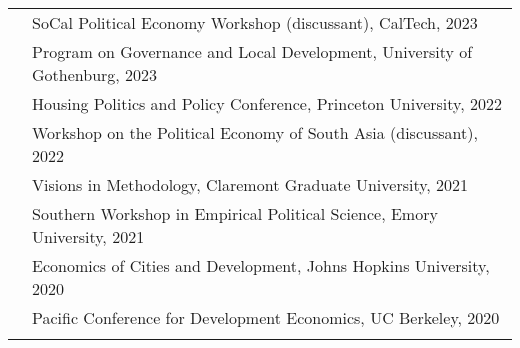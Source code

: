 \documentclass[letterpaper, 10.5pt]{article}
\begin{document}
\begin{longtable}{p{1.5in}p{5in}}
&SoCal Political Economy Workshop (discussant), CalTech, 2023\\
 &Program on Governance and Local Development, University of Gothenburg, 2023\\

           &Housing Politics and Policy Conference, Princeton University, 2022\\
 & Workshop on the Political Economy of South Asia (discussant), 2022\\        



  & Visions in Methodology, Claremont Graduate University, 2021 \\
  
    &Southern Workshop in Empirical Political Science, Emory University, 2021 \\
 

 & Economics of Cities and Development, Johns Hopkins University, 2020\\
 & Pacific Conference for Development Economics, UC Berkeley, 2020 \\
 &\\


% 
 

\end{longtable}
\end{document}

